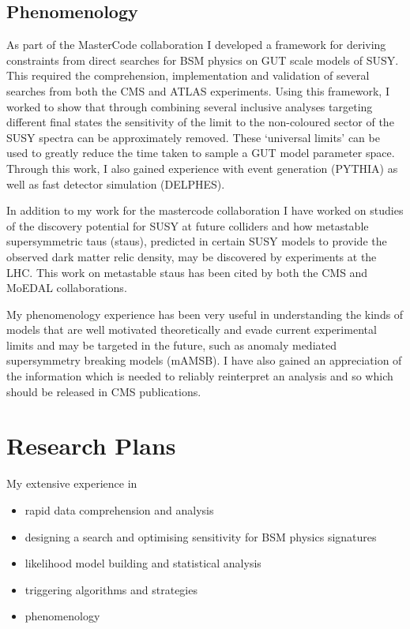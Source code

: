 \documentclass[11pt]{article}
\theoremstyle{plain} \numberwithin{equation}{section}
\theoremstyle{definition}
\begin{document}
\subsection*{Phenomenology}
As part of the MasterCode collaboration I developed a framework for 
deriving constraints from direct searches for BSM physics on GUT scale models of SUSY.
This required the comprehension, implementation and validation of several 
searches from both the CMS and ATLAS experiments. Using this framework, I worked to show that through combining several inclusive analyses targeting 
different final states the sensitivity of the limit to the non-coloured sector of the SUSY spectra can be approximately removed. 
These `universal limits' can be used to greatly reduce the time taken to sample a GUT model parameter space. 
Through this work, I also gained experience with event generation (PYTHIA) as well as fast detector simulation (DELPHES).

In addition to my work for the mastercode collaboration I have worked on 
studies of the discovery potential for SUSY at future colliders and how 
metastable supersymmetric taus (staus), predicted in certain SUSY models to provide the observed
dark matter relic density, may be discovered by experiments at the LHC. 
This work on metastable staus has been cited by both the CMS and MoEDAL collaborations.

My phenomenology experience has been very useful in understanding
the kinds of models that are well motivated theoretically and evade current experimental limits and may be targeted in the 
future, such as anomaly mediated supersymmetry breaking models (mAMSB). I have also gained an appreciation
of the information which is needed to reliably reinterpret an analysis and so which should be released in CMS publications.

\section*{Research Plans}

My extensive experience in

\begin{itemize}
\item rapid data comprehension and analysis
\item designing a search and optimising sensitivity for BSM physics signatures
\item likelihood model building and statistical analysis 
\item triggering algorithms and strategies
\item phenomenology
\end{itemize}
\end{document}
